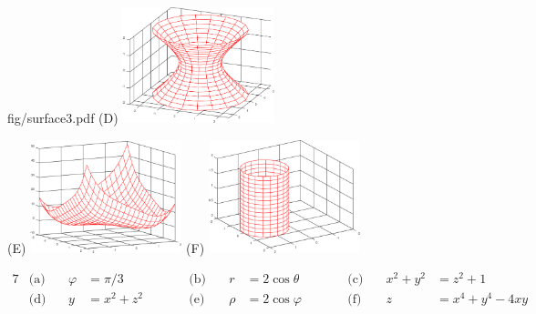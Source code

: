 \begin{question}[M200 2008A]
\begin{center}
{                                                   {fig/surface3.pdf}}
\qquad
  (D)  \raisebox{-0.5\height} 
            { \includegraphics[width=0.33\textwidth, height=0.3\textwidth]
                                                    {fig/surface4.pdf}}
\end{center}
\begin{center}
 (E) \raisebox{-0.5\height}
           { \includegraphics[width=0.33\textwidth, height=0.3\textwidth]
                                                    {fig/surface5.pdf}}
\qquad
  (F) \raisebox{-0.5\height}
           {  \includegraphics[width=0.33\textwidth, height=0.3\textwidth]
                                                    {fig/surface6a.pdf}}
\end{center}

\begin{alignat*}{7}
&\text{(a)}\quad& \varphi&=\pi/3 &
&\text{(b)}\quad& r&=2\cos\theta &
&\text{(c)}\quad& x^2+y^2&=z^2+1 \\
&\text{(d)}& y&=x^2+z^2\qquad &
&\text{(e)}& \rho&=2\cos\varphi\qquad &
&\text{(f)}& z&=x^4+y^4-4xy &
\end{alignat*}
\end{question}

%

